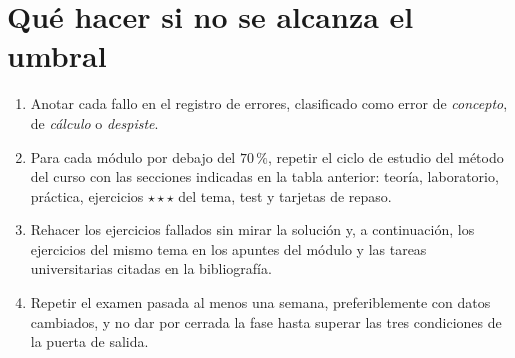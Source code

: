 \section{Qué hacer si no se alcanza el umbral}

\begin{enumerate}[label=\arabic*.]
  \item Anotar cada fallo en el registro de errores, clasificado como error de \emph{concepto}, de \emph{cálculo} o \emph{despiste}.
  \item Para cada módulo por debajo del $70\,\%$, repetir el ciclo de estudio del método del curso con las secciones indicadas en la tabla anterior: teoría, laboratorio, práctica, ejercicios $\star\star\star$ del tema, test y tarjetas de repaso.
  \item Rehacer los ejercicios fallados sin mirar la solución y, a continuación, los ejercicios del mismo tema en los apuntes del módulo y las tareas universitarias citadas en la bibliografía.
  \item Repetir el examen pasada al menos una semana, preferiblemente con datos cambiados, y no dar por cerrada la fase hasta superar las tres condiciones de la puerta de salida.
\end{enumerate}
